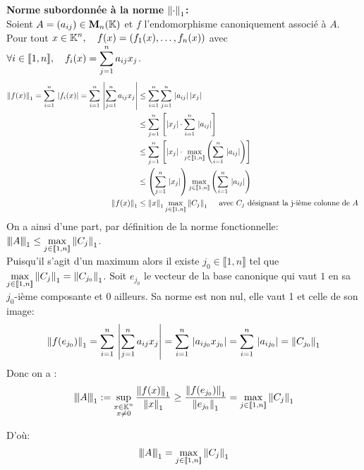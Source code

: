 \documentclass[12pt,a4paper]{article}
\begin{document}
	\textbf{Norme subordonnée à la norme $\norm{\cdot}_1$:}\\
	Soient $A=(a_{ij})\in \mathbf{M}_n (\ens{K})$ et $f$ l'endomorphisme canoniquement associé à $A$.\\
	Pour tout $\grandm x\in \ens{K}^n, \quad f(x)=\left(f_1 (x), \dots, f_n (x) \right)$ avec $\grandm \forall i\in \llbracket 1,n \rrbracket, \quad f_i (x)=\somme{j=1}{n} a_{ij} x_j$.
	\begin{align*}
		\norm{f(x)}_1 = \somme{i=1}{n}\abs{f_i (x)} =\somme{i=1}{n} \abs{\somme{j=1}{n}a_{ij} x_j } &\leq \somme{i=1}{n}\somme{j=1}{n}\abs{a_{ij}}\abs{x_j}\\
		&\leq \somme{j=1}{n}\left[ \abs{x_j}\cdot\somme{i=1}{n}\abs{a_{ij}} \right]\\
		&\leq \somme{j=1}{n}\left[ \abs{x_j}\cdot\max_{j\in\llbracket 1,n \rrbracket}\left(\somme{i=1}{n}\abs{a_{ij}}\right) \right]\\
		&\leq \left(\somme{j=1}{n} \abs{x_j}\right) \max_{j\in\llbracket 1,n \rrbracket}\left(\somme{i=1}{n}\abs{a_{ij}}\right)\\
		\norm{f(x)}_1	&\leq \norm{x}_1 \max_{j\in\llbracket 1,n \rrbracket} \norm{C_j}_1 \quad\text{ avec $C_j$ désignant la j-ième colonne de $A$ } 
	\end{align*}
	On a ainsi d'une part, par définition de la norme fonctionnelle: $\grandm\fonctnorm{A}_1 \leq \max\limits_{j\in\llbracket 1,n \rrbracket} \norm{C_j}_1$.\\
	Puisqu'il s'agit d'un maximum alors il existe $j_0\in\llbracket 1,n \rrbracket$ tel que $\max\limits_{j\in\llbracket 1,n \rrbracket}\norm{C_j}_1 =\norm{C_{j_0}}_1$. Soit $e_{j_0}$ le vecteur de la base canonique qui vaut $1$ en sa $j_{0}$-ième composante et $0$ ailleurs. Sa norme est non nul, elle vaut 1 et celle de son image:
	$$\norm{f(e_{j_0})}_1 =\somme{i=1}{n} \abs{\somme{j=1}{n}a_{ij} x_j }=\somme{i=1}{n} \abs{a_{i{j_0}} x_{j_0} }=\somme{i=1}{n} \abs{a_{i{j_0}}  }=\norm{C_{j_0}}_1 $$
	Donc on a :
	$$ \fonctnorm{A}_1 :=\sup_{\substack{x\in \ens{K}^n \\ x\neq 0}} \frac{\norm{f(x)}_1}{\norm{x}_1} \geq \frac{\norm{f(e_{j_0})}_1}{\norm{e_{j_0}}_1}=\max_{j\in\llbracket 1,n \rrbracket} \norm{C_j}_1 $$
	
	D'où: $$ \fonctnorm{A}_1=\max_{j\in\llbracket 1,n \rrbracket} \norm{C_j}_1$$
	
\end{document}

